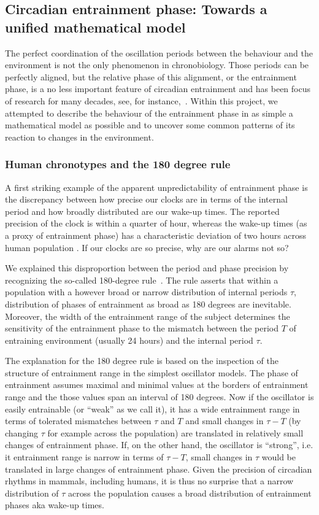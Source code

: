 \subsection{Circadian entrainment phase: Towards a unified mathematical
model}

The perfect coordination of the oscillation periods between the
behaviour and the environment is not the only phenomenon in
chronobiology. Those periods can be perfectly aligned, but the
relative phase of this alignment, or the entrainment phase, is a no
less important feature of circadian entrainment and has been focus of
research for many decades, see, for
instance,~\cite{pittendrigh1981circadian}. Within this project, we
attempted to describe the behaviour of the entrainment phase in as
simple a mathematical model as possible and to uncover some common
patterns of its reaction to changes in the environment.

\subsubsection{Human chronotypes and the 180 degree rule}
A first striking example of the apparent unpredictability of
entrainment phase is the discrepancy between how precise our clocks
are in terms of the internal period and how broadly distributed are
our wake-up times. The reported precision of the clock is within a
quarter of hour, whereas the wake-up times (as a proxy of entrainment
phase) has a characteristic deviation of two hours across human
population \cite{duffy2005entrainment}. If our clocks are so precise,
why are our alarms not so?

We explained this disproportion between the period and phase precision
by recognizing the so-called 180-degree rule~\cite{granada2013human}.
The rule asserts that within a population with a however broad or
narrow distribution of internal periods $\tau$, distribution of phases
of entrainment as broad as 180 degrees are inevitable. Moreover, the
width of the entrainment range of the subject determines the
sensitivity of the entrainment phase to the mismatch between the
period $T$ of entraining environment (usually 24 hours) and the
internal period $\tau$.

The explanation for the 180 degree rule is based on the inspection of
the structure of entrainment range in the simplest oscillator models.
The phase of entrainment assumes maximal and minimal values at the
borders of entrainment range and the those values span an interval of
180 degrees. Now if the oscillator is easily entrainable (or ``weak''
as we call it), it has a wide entrainment range in terms of tolerated
mismatches between $\tau$ and $T$ and small changes in $\tau-T$ (by
changing $\tau$ for example across the population) are translated in
relatively small changes of entrainment phase. If, on the other hand,
the oscillator is ``strong'', i.e. it entrainment range is narrow in
terms of $\tau-T$, small changes in $\tau$ would be translated in
large changes of entrainment phase. Given the precision of circadian
rhythms in mammals, including humans, it is thus no surprise that
a narrow distribution of $\tau$ across the population causes a broad
distribution of entrainment phases aka wake-up times.

